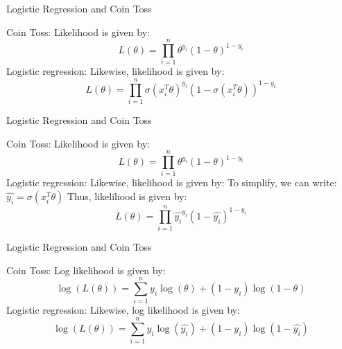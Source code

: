 \documentclass{beamer}
\begin{document}


        
        
        
    



\begin{frame}{Logistic Regression and Coin Toss}

    Coin Toss: Likelihood is given by:
    $$L(\theta) = \prod_{i=1}^n \theta^{y_i}(1-\theta)^{1-y_i}$$
    \vspace{10pt}
    \pause 
    Logistic regression: Likewise, likelihood is given by:
    $$L(\theta) = \prod_{i=1}^n \sigma(x_i^T\theta)^{y_i}(1-\sigma(x_i^T\theta))^{1-y_i}$$
\end{frame}

\begin{frame}{Logistic Regression and Coin Toss}

    Coin Toss: Likelihood is given by:
    $$L(\theta) = \prod_{i=1}^n \theta^{y_i}(1-\theta)^{1-y_i}$$
    \vspace{10pt}
    \pause 
    Logistic regression: Likewise, likelihood is given by:
    \pause To simplify, we can write: $\hat{y_i} = \sigma(x_i^T\theta)$
    \pause Thus, likelihood is given by:
    $$L(\theta) = \prod_{i=1}^n \hat{y_i}^{y_i}(1-\hat{y_i})^{1-y_i}$$
\end{frame}

\begin{frame}{Logistic Regression and Coin Toss}

    Coin Toss: Log likelihood is given by:
    $$\log(L(\theta)) = \sum_{i=1}^n y_i\log(\theta) + (1-y_i)\log(1-\theta)$$
    \vspace{10pt}
    \pause 
    Logistic regression: Likewise, log likelihood is given by:
    $$\log(L(\theta)) = \sum_{i=1}^n y_i\log(\hat{y_i}) + (1-y_i)\log(1-\hat{y_i})$$
\end{frame}
\end{document}
